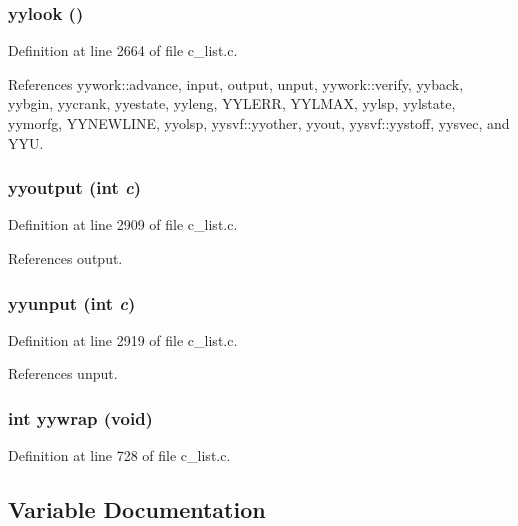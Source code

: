 \subsubsection{\setlength{\rightskip}{0pt plus 5cm}yylook ()}\label{c__list_8c_81f50fcab7a210c90eb561a3ebeb3b52}




Definition at line 2664 of file c\_\-list.c.

References yywork::advance, input, output, unput, yywork::verify, yyback, yybgin, yycrank, yyestate, yyleng, YYLERR, YYLMAX, yylsp, yylstate, yymorfg, YYNEWLINE, yyolsp, yysvf::yyother, yyout, yysvf::yystoff, yysvec, and YYU.
\subsubsection{\setlength{\rightskip}{0pt plus 5cm}yyoutput (int {\em c})}\label{c__list_8c_83bc497bbfffab9fd911e1f1262fb342}




Definition at line 2909 of file c\_\-list.c.

References output.
\subsubsection{\setlength{\rightskip}{0pt plus 5cm}yyunput (int {\em c})}\label{c__list_8c_76ac9a27c10c26d1c6ed0d61caf1251f}




Definition at line 2919 of file c\_\-list.c.

References unput.
\subsubsection{\setlength{\rightskip}{0pt plus 5cm}int yywrap (void)}\label{c__list_8c_9ae7dd87893ed6cebc02d0d5f84c2ede}




Definition at line 728 of file c\_\-list.c.

\subsection{Variable Documentation}
